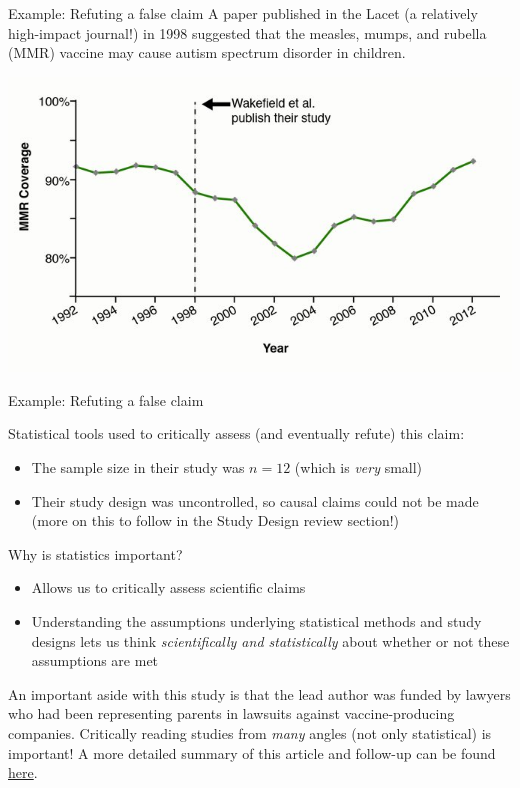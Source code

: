 \documentclass[10pt,t]{beamer}
\begin{document}
\begin{frame}{Example: Refuting a false claim}
A paper published in the Lacet (a relatively high-impact journal!) in 1998 suggested that the measles, mumps, and rubella (MMR) vaccine may cause autism spectrum disorder in children.

\centering \includegraphics[scale=0.4]{mmrvax.jpg}

\end{frame}

\begin{frame}{Example: Refuting a false claim}

Statistical tools used to critically assess (and eventually refute) this claim:
\begin{itemize}
	\item The sample size in their study was $n = 12$ (which is \textit{very} small)
	\item Their study design was uncontrolled, so causal claims could not be made (more on this to follow in the Study Design review section!)
\end{itemize}

\vspace{0.3cm}

Why is statistics important?
\begin{itemize}
	\item Allows us to critically assess scientific claims
	\item Understanding the assumptions underlying statistical methods and study designs lets us think \textit{scientifically and statistically} about whether or not these assumptions are met
\end{itemize}

\vspace{0.3cm}

\footnotesize An important aside with this study is that the lead author was funded by lawyers who had been representing parents in lawsuits against vaccine-producing companies. Critically reading studies from \textit{many} angles (not only statistical) is important! A more detailed summary of this article and follow-up can be found \href{https://www.ncbi.nlm.nih.gov/pmc/articles/PMC3136032/}{\color{cyan} here}.

\end{frame}
\end{document}
